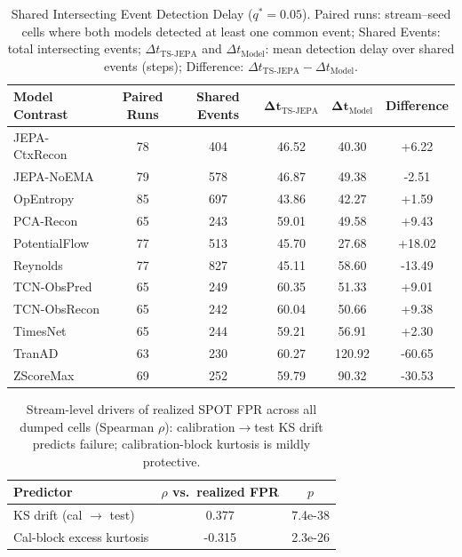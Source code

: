 \begin{table}[t]
\centering
\scriptsize
\caption{Shared Intersecting Event Detection Delay ($q^*{=}0.05$). Paired runs: stream--seed cells where both models detected at least one common event; Shared Events: total intersecting events; $\Delta t_{\mathrm{TS\text{-}JEPA}}$ and $\Delta t_{\mathrm{Model}}$: mean detection delay over shared events (steps); Difference: $\Delta t_{\mathrm{TS\text{-}JEPA}} - \Delta t_{\mathrm{Model}}$.}\label{tab:delay_intersection}
\scriptsize
\setlength{\tabcolsep}{2.5pt}
\begin{tabular}{@{}lccccc@{}}
\toprule
\textbf{Model Contrast} & \textbf{Paired Runs} & \textbf{Shared Events} & $\mathbf{\Delta t_{\mathrm{TS\text{-}JEPA}}}$ & $\mathbf{\Delta t_{\mathrm{Model}}}$ & \textbf{Difference} \\
\midrule
JEPA-CtxRecon & 78 & 404 & 46.52 & 40.30 & +6.22 \\
JEPA-NoEMA    & 79 & 578 & 46.87 & 49.38 & -2.51 \\
OpEntropy     & 85 & 697 & 43.86 & 42.27 & +1.59 \\
PCA-Recon     & 65 & 243 & 59.01 & 49.58 & +9.43 \\
PotentialFlow & 77 & 513 & 45.70 & 27.68 & +18.02 \\
Reynolds      & 77 & 827 & 45.11 & 58.60 & -13.49 \\
TCN-ObsPred   & 65 & 249 & 60.35 & 51.33 & +9.01 \\
TCN-ObsRecon  & 65 & 242 & 60.04 & 50.66 & +9.38 \\
TimesNet      & 65 & 244 & 59.21 & 56.91 & +2.30 \\
TranAD        & 63 & 230 & 60.27 & 120.92 & -60.65 \\
ZScoreMax     & 69 & 252 & 59.79 & 90.32 & -30.53 \\
\bottomrule
\end{tabular}
\end{table}

\begin{table}[t]
\centering
\scriptsize
\caption{Stream-level drivers of realized SPOT FPR across all dumped cells (Spearman $\rho$): calibration$\to$test KS drift predicts failure; calibration-block kurtosis is mildly protective.}\label{tab:drift_link}
\begin{tabular}{@{}lcc@{}}
\toprule
Predictor & $\rho$ vs.\ realized FPR & $p$ \\
\midrule
KS drift (cal $\to$ test) & 0.377 & 7.4e-38 \\
Cal-block excess kurtosis & -0.315 & 2.3e-26 \\
\bottomrule
\end{tabular}
\end{table}

